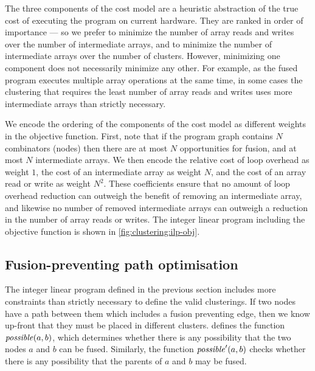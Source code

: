 The three components of the cost model are a heuristic abstraction of the true cost of executing the program on current hardware.
They are ranked in order of importance --- so we prefer to minimize the number of array reads and writes over the number of intermediate arrays, and to minimize the number of intermediate arrays over the number of clusters.
However, minimizing one component does not necessarily minimize any other.
For example, as the fused program executes multiple array operations at the same time, in some cases the clustering that requires the least number of array reads and writes uses more intermediate arrays than strictly necessary.

We encode the ordering of the components of the cost model as different weights in the objective function.
First, note that if the program graph contains $N$ combinators (nodes) then there are at most $N$ opportunities for fusion, and at most $N$ intermediate arrays.
We then encode the relative cost of loop overhead as weight $1$, the cost of an intermediate array as weight $N$, and the cost of an array read or write as weight $N^2$.
These coefficients ensure that no amount of loop overhead reduction can outweigh the benefit of removing an intermediate array, and likewise no number of removed intermediate arrays can outweigh a reduction in the number of array reads or writes.
The integer linear program including the objective function is shown in \cref{fig:clustering:ilp-obj}.




\subsection{Fusion-preventing path optimisation}
\label{clustering:s:OptimisedConstraints}
The integer linear program defined in the previous section includes more constraints than strictly necessary to define the valid clusterings.
If two nodes have a path between them which includes a fusion preventing edge, then we know up-front that they must be placed in different clusters.
 defines the function $\mathit{possible}(a,b)$, which determines whether there is any possibility that the two nodes $a$ and $b$ can be fused.
Similarly, the function $\mathit{possible}'(a, b)$ checks whether there is any possibility that the parents of $a$ and $b$ may be fused.

